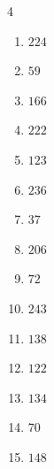 \begin{multicols}{4}
\begin{enumerate}

\columnbreak %

  \item $224$


  \item $59$


  \item $166$


  \item $222$


  \item $123$


  \item $236$


  \item $37$


  \item $206$


  \item $72$


  \item $243$


  \item $138$


  \item $122$


  \item $134$


  \item $70$


  \item $148$



\end{enumerate}
\end{multicols}
